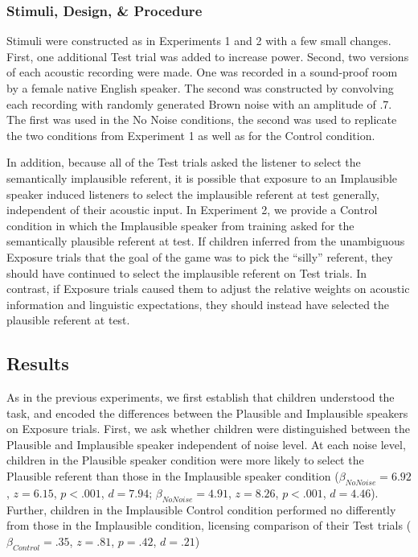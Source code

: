 \documentclass[man,floatsintext]{apa6}
\begin{document}
\subsubsection{Stimuli, Design, \& Procedure}

Stimuli were constructed as in Experiments 1 and 2 with a few small changes. First, one additional Test trial was added to increase power. Second, two versions of each acoustic recording were made. One was recorded in a sound-proof room by a female native English speaker. The second was constructed by convolving each recording with randomly generated Brown noise with an amplitude of .7. The first was used in the No Noise conditions, the second was used to replicate the two conditions from Experiment 1 as well as for the Control condition.

In addition, because all of the Test trials asked the listener to select the semantically implausible referent, it is possible that exposure to an Implausible speaker induced listeners to select the implausible referent at test generally, independent of their acoustic input.  In Experiment 2, we provide a Control condition in which the Implausible speaker from training asked for the semantically plausible referent at test. If children inferred from the unambiguous Exposure trials that the goal of the game was to pick the ``silly'' referent, they should have continued to select the implausible referent on Test trials. In contrast, if Exposure trials caused them to adjust the relative weights on acoustic information and linguistic expectations, they should instead have selected the plausible referent at test.

\subsection{Results}

As in the previous experiments, we first establish that children understood the task, and encoded the differences between the Plausible and Implausible speakers on Exposure trials. First, we ask whether children were distinguished between the Plausible and Implausible speaker independent of noise level. At each noise level, children in the Plausible speaker condition were more likely to select the Plausible referent than those in the Implausible speaker condition ($\beta_{No Noise} = 6.92$, $z =6.15$, $p < .001$, $d = 7.94$; $\beta_{No Noise} = 4.91$, $z =8.26$, $p < .001$, $d = 4.46$). Further, children in the Implausible Control condition performed no differently from those in the Implausible condition, licensing comparison of their Test trials ($\beta_{Control} = .35$, $z =.81$, $p = .42$, $d = .21$)
\end{document}
